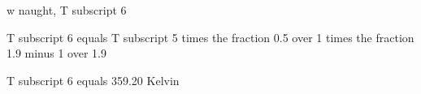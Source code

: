 w naught, T subscript 6

T subscript 6 equals T subscript 5 times the fraction 0.5 over 1 times the fraction 1.9 minus 1 over 1.9

T subscript 6 equals 359.20 Kelvin